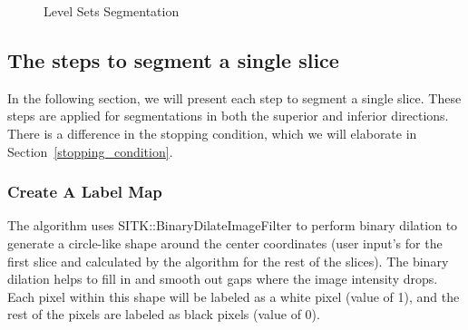 \begin{figure}[H] 
\centering
{}%
%
%
\caption[Level Sets Segmentation]{Level Sets Segmentation}
\label{LSS}
\end{figure}

\subsection{The steps to segment a single slice}
In the following section, we will present each step to segment a single slice. These steps are applied for segmentations in both the superior and inferior directions. There is a difference in the stopping condition, which we will elaborate in Section~\ref{stopping_condition}.

\subsubsection{Create A Label Map}\label{label_map}
The algorithm uses SITK::BinaryDilateImageFilter to perform binary dilation to generate a circle-like shape around the center coordinates (user input’s for the first slice and calculated by the algorithm for the rest of the slices). The binary dilation helps to fill in and smooth out gaps where the image intensity drops. Each pixel within this shape will be labeled as a white pixel (value of 1), and the rest of the pixels are labeled as black pixels (value of 0). 

